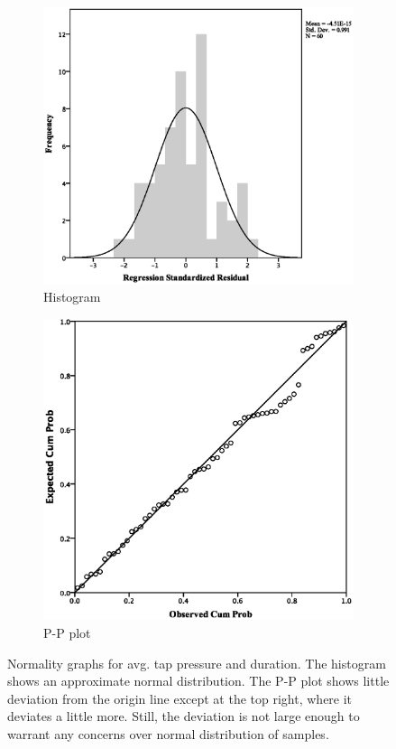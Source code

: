 \par\bigskip
\par\bigskip
\begin{figure}[ht]
\begin{subfigure}[b]{0.45\textwidth}
    \centering
    \includegraphics[width=\textwidth]{images/secondary/avg/AvgHistogram.eps}
    \caption{Histogram}
    \label{fig:sec_avg_hist}
\end{subfigure}
\quad
\begin{subfigure}[b]{0.45\textwidth}
    \centering
    \includegraphics[width=\textwidth]{images/secondary/avg/AvgP-P.eps}
    \caption{P-P plot}
    \label{fig:sec_avg_PP}
\end{subfigure}
\caption{Normality graphs for avg. tap pressure and duration. The histogram shows an approximate normal distribution. The P-P plot shows little deviation from the origin line except at the top right, where it deviates a little more. Still, the deviation is not large enough to warrant any concerns over normal distribution of samples.}
\end{figure}